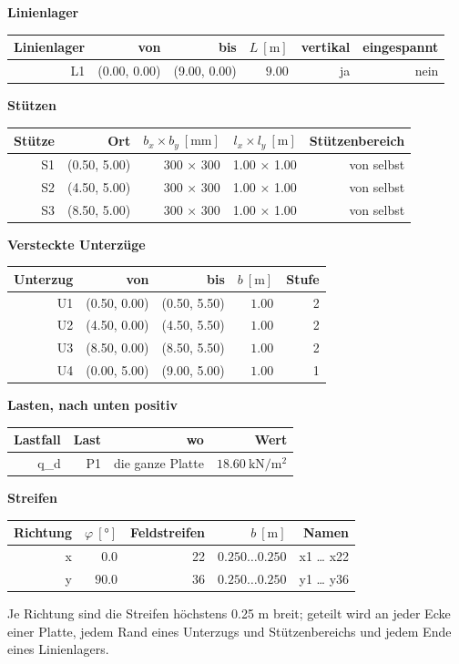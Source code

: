 \documentclass[11pt,a4paper]{article}
\begin{document}
\noindent\textbf{Linienlager}
\begin{longtable}{rrrrrr}
\hline
Linienlager & von & bis & $L\ [\mathrm{m}]$ & vertikal & eingespannt \\
\hline
\endhead
L1 & (0.00, 0.00) & (9.00, 0.00) & $9.00$ & ja & nein \\
\hline
\end{longtable}
\noindent\textbf{Stützen}
\begin{longtable}{rrrrr}
\hline
Stütze & Ort & $b_x \times b_y\ [\mathrm{mm}]$ & $l_x \times l_y\ [\mathrm{m}]$ & Stützenbereich \\
\hline
\endhead
S1 & (0.50, 5.00) & 300 × 300 & 1.00 × 1.00 & von selbst \\
S2 & (4.50, 5.00) & 300 × 300 & 1.00 × 1.00 & von selbst \\
S3 & (8.50, 5.00) & 300 × 300 & 1.00 × 1.00 & von selbst \\
\hline
\end{longtable}
\noindent\textbf{Versteckte Unterzüge}
\begin{longtable}{rrrrr}
\hline
Unterzug & von & bis & $b\ [\mathrm{m}]$ & Stufe \\
\hline
\endhead
U1 & (0.50, 0.00) & (0.50, 5.50) & $1.00$ & 2 \\
U2 & (4.50, 0.00) & (4.50, 5.50) & $1.00$ & 2 \\
U3 & (8.50, 0.00) & (8.50, 5.50) & $1.00$ & 2 \\
U4 & (0.00, 5.00) & (9.00, 5.00) & $1.00$ & 1 \\
\hline
\end{longtable}
\noindent\textbf{Lasten, nach unten positiv}
\begin{longtable}{rrrr}
\hline
Lastfall & Last & wo & Wert \\
\hline
\endhead
q\_d & P1 & die ganze Platte & $18.60\ \mathrm{kN/m^{2}}$ \\
\hline
\end{longtable}
\noindent\textbf{Streifen}
\begin{longtable}{rrrrr}
\hline
Richtung & $\varphi\ [°]$ & Feldstreifen & $b\ [\mathrm{m}]$ & Namen \\
\hline
\endhead
x & $0.0$ & 22 & $0.250 \ldots 0.250$ & x1 … x22 \\
y & $90.0$ & 36 & $0.250 \ldots 0.250$ & y1 … y36 \\
\hline
\end{longtable}
Je Richtung sind die Streifen höchstens 0.25 m breit; geteilt wird an jeder Ecke einer Platte, jedem Rand eines Unterzugs und Stützenbereichs und jedem Ende eines Linienlagers.
\end{document}
